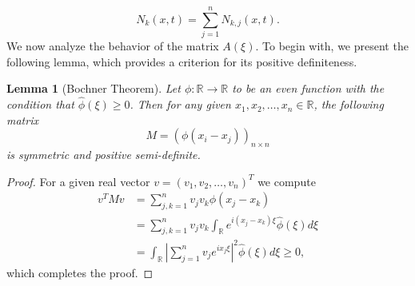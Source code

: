 \documentclass[11pt]{article}
\newtheorem{lemma}{Lemma}[section]
\theoremstyle{definition}
\numberwithin{equation}{section}
\begin{document}
\begin{equation}
    N_k(x,t)=\sum_{j=1}^nN_{k,j}(x,t).
\end{equation}
We now analyze the behavior of the matrix \(A(\xi)\). To begin with, we present the following lemma, which provides a criterion for its positive definiteness.
\begin{lemma}[Bochner Theorem]\label{Bochner lemma}
    Let $\phi:\mathbb{R}\rightarrow\mathbb{R}$ to be an even function with the condition that $\hat{\phi}(\xi)\geq0$. Then for any given  $x_1,x_2,\dots,x_n\in\mathbb{R}$, the following matrix
    \begin{equation}
        M=(\phi(x_i-x_j))_{n\times n}
    \end{equation}
    is symmetric and positive semi-definite.
\end{lemma}
\begin{proof}
    For a given real vector $v=(v_1,v_2,\dots,v_n)^T$ we compute
    \begin{align}
        v^TMv&=\sum_{j,k=1}^nv_jv_k\phi(x_j-x_k)\\
        &=\sum_{j,k=1}^nv_jv_k\int_{\mathbb{R}}e^{i(x_j-x_k)\xi}\hat{\phi}(\xi)d\xi\\
        &=\int_{\mathbb{R}}\left|\sum_{j=1}^nv_je^{ix_j\xi}\right|^2\hat{\phi}(\xi)d\xi\geq0,
    \end{align}
    which completes the proof.
\end{proof}
\end{document}
